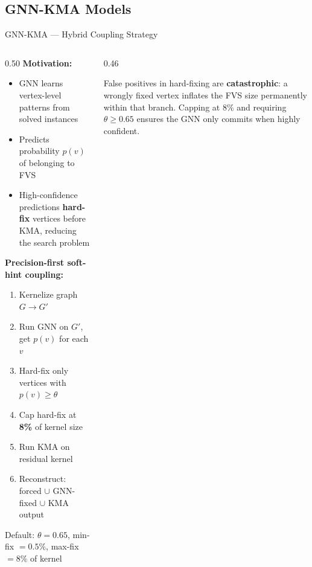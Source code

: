 \documentclass[aspectratio=169,10pt]{beamer}
\renewcommand{\footnotesize}{\tiny}
\begin{document}
\subsection{GNN-KMA Models}

\begin{frame}{GNN-KMA — Hybrid Coupling Strategy}
  \begin{columns}[T]
    \begin{column}{0.50\textwidth}
      \textbf{Motivation:}
      \begin{itemize}
        \item GNN learns vertex-level patterns from solved instances
        \item Predicts probability $p(v)$ of belonging to FVS
        \item High-confidence predictions \textbf{hard-fix} vertices
          before KMA, reducing the search problem
      \end{itemize}
      \vspace{6pt}
      \textbf{Precision-first soft-hint coupling:}
      \begin{enumerate}\setlength\itemsep{2pt}
        \item Kernelize graph $G \to G'$
        \item Run GNN on $G'$, get $p(v)$ for each $v$
        \item Hard-fix only vertices with $p(v) \ge \theta$
        \item Cap hard-fix at \textbf{8\%} of kernel size
        \item Run KMA on residual kernel
        \item Reconstruct: forced $\cup$ GNN-fixed $\cup$ KMA output
      \end{enumerate}
      \vspace{3pt}
      {\footnotesize Default: $\theta=0.65$,
       min-fix $= 0.5\%$, max-fix $= 8\%$ of kernel}
    \end{column}
    \begin{column}{0.46\textwidth}
      \begin{tcolorbox}[mybox,title=Why Precision-First?]
        \footnotesize
        False positives in hard-fixing are \textbf{catastrophic}:
        a wrongly fixed vertex inflates the FVS size permanently
        within that branch. Capping at 8\% and requiring $\theta \ge 0.65$
        ensures the GNN only commits when highly confident.

\end{tcolorbox}
\end{column}
\end{columns}
\end{frame}
\end{document}
